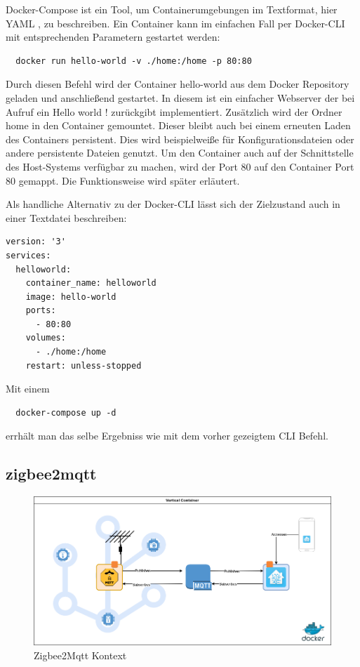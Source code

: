 Docker-Compose ist ein Tool, um Containerumgebungen im Textformat, hier \grqq YAML \grqq{}, zu beschreiben.
Ein Container kann im einfachen Fall per Docker-CLI mit entsprechenden Parametern gestartet werden:
\begin{lstlisting}
  docker run hello-world -v ./home:/home -p 80:80
\end{lstlisting}

Durch diesen Befehl wird der Container \grqq hello-world \grqq aus dem Docker Repository geladen und anschließend gestartet. In diesem ist ein einfacher Webserver der bei
Aufruf ein \grqq Hello world ! \grqq{} zurückgibt implementiert. Zusätzlich wird der Ordner \grqq home \grqq{} in den Container gemountet. Dieser bleibt auch bei einem
erneuten Laden des Containers persistent. Dies wird beispielweiße für Konfigurationsdateien oder andere persistente Dateien genutzt. Um den Container auch auf der Schnittstelle
des Host-Systems verfügbar zu machen, wird der Port 80 auf den Container Port 80 gemappt. Die Funktionsweise wird später erläutert.

Als handliche Alternativ zu der Docker-CLI lässt sich der Zielzustand auch in einer Textdatei beschreiben:

\begin{lstlisting}
version: '3'
services:
  helloworld:
    container_name: helloworld
    image: hello-world
    ports:
      - 80:80
    volumes:
      - ./home:/home
    restart: unless-stopped
\end{lstlisting}

Mit einem 
\begin{lstlisting}
  docker-compose up -d
\end{lstlisting}

errhält man das selbe Ergebniss wie mit dem vorher gezeigtem CLI Befehl.

\subsection{zigbee2mqtt}

\begin{figure}[H]
  \centering
  \includegraphics[width=1\textwidth]{media/z2m-arch.png}
  \caption{Zigbee2Mqtt Kontext}
\end{figure}

